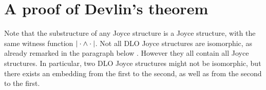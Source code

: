 \section{A proof of Devlin's theorem}

Note that the substructure of any Joyce structure is a Joyce structure, with the same witness function $|\cdot\wedge\cdot|$. Not all DLO Joyce structures are isomorphic, as already remarked in the paragraph below . 
However they all contain all Joyce structures. In particular, two DLO Joyce structures might not be isomorphic, but there exists an embedding from the first to the second, as well as from the second to the first.


